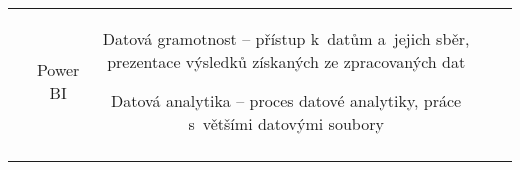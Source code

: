 \begin{landscape}
\begin{table}[htbp]
{\begin{tabularx}{\linewidth}{CCCCC}
&

Power BI

&

Datová gramotnost – přístup k~datům a~jejich sběr, prezentace výsledků získaných ze zpracovaných dat

Datová analytika – proces datové analytiky, práce s~většími datovými soubory

\\

\tabularnewline
\bottomrule
\end{tabularx}

}

\end{table}

\end{landscape}